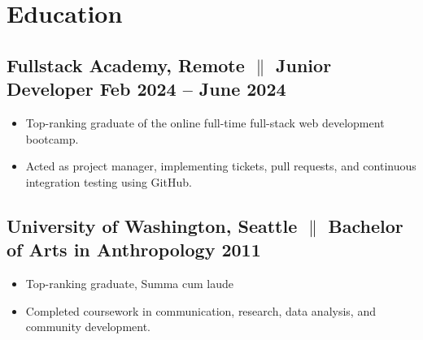 \documentclass[a4paper,12pt]{article} %
\begin{document}
\section{Education}
\subsection{Fullstack Academy, Remote {$\parallel$} {Junior Developer} \hfill
      \textbf{Feb 2024 – June 2024}}
\begin{itemize}
      \item Top-ranking graduate of the online full-time full-stack web development bootcamp.
      \item Acted as project manager, implementing tickets, pull requests, and continuous integration testing using GitHub.
\end{itemize}

\subsection{University of Washington, Seattle {$\parallel$}{ Bachelor of Arts in Anthropology} \hfill
      \textbf{2011}}
\begin{itemize}
      \item Top-ranking graduate, Summa cum laude
      \item Completed coursework in communication, research, data analysis, and community development.
\end{itemize}
\end{document}
